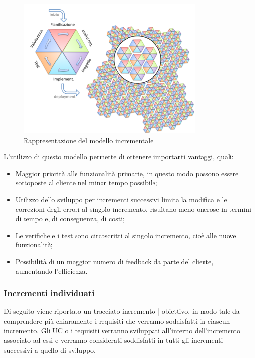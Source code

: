 \documentclass[../piano_di_progetto.tex]{subfiles}
\begin{document}
\begin{figure}[H]
    \centering
    \includegraphics[scale = 0.6]{src/img/modello_incrementale.png}
    \caption{Rappresentazione del modello incrementale}
    \label{fig:logo}
\end{figure}

L'utilizzo di questo modello permette di ottenere importanti vantaggi, quali:
\begin{itemize}
    \item Maggior priorità alle funzionalità primarie, in questo modo possono essere sottoposte al cliente nel minor tempo possibile;
    \item Utilizzo dello sviluppo per incrementi successivi limita la modifica e le correzioni degli errori al singolo incremento, risultano meno onerose in termini di tempo e, di conseguenza, di costi;
    \item Le verifiche e i test sono circoscritti al singolo incremento, cioè alle nuove funzionalità;
    \item Possibilità di un maggior numero di feedback da parte del cliente, aumentando l'efficienza.
\end{itemize}


\subsubsection{Incrementi individuati}
\label{ssub:incr_ind}

Di seguito viene riportato un tracciato incremento | obiettivo, in modo tale da comprendere più chiaramente i requisiti che verranno soddisfatti in ciascun incremento. 
Gli UC o i requisiti verranno sviluppati all'interno dell'incremento associato ad essi e verranno considerati soddisfatti in tutti gli incrementi successivi a quello di sviluppo.
\end{document}
